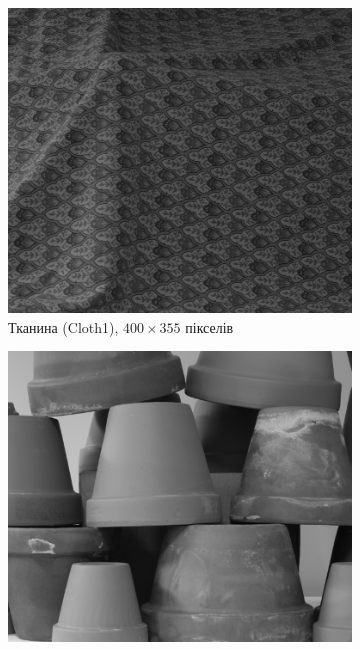 \begin{figure}[h]
\centering
    \begin{subfigure}[t]{0.32\textwidth}
        \centering
        \includegraphics[width=\textwidth]{images/cloth_right}
        \caption{Тканина (Cloth1), $400 \times 355$ пікселів}
        \label{fig:cloth:right}
    \end{subfigure}
    \hfill
    \begin{subfigure}[t]{0.32\textwidth}
        \centering
        \includegraphics[width=\textwidth]{images/pots_right}

\end{subfigure}
\end{figure}
